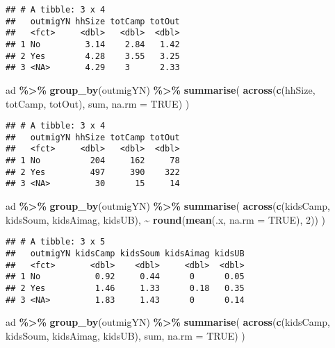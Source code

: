 \documentclass[
]{article}
\newenvironment{Shaded}{\begin{snugshade}}{\end{snugshade}}
\newcommand{\AttributeTok}[1]{\textcolor[rgb]{0.13,0.29,0.53}{#1}}
\newcommand{\ConstantTok}[1]{\textcolor[rgb]{0.56,0.35,0.01}{#1}}
\newcommand{\DecValTok}[1]{\textcolor[rgb]{0.00,0.00,0.81}{#1}}
\newcommand{\FunctionTok}[1]{\textcolor[rgb]{0.13,0.29,0.53}{\textbf{#1}}}
\newcommand{\NormalTok}[1]{#1}
\newcommand{\SpecialCharTok}[1]{\textcolor[rgb]{0.81,0.36,0.00}{\textbf{#1}}}
\begin{document}
\begin{verbatim}
## # A tibble: 3 x 4
##   outmigYN hhSize totCamp totOut
##   <fct>     <dbl>   <dbl>  <dbl>
## 1 No         3.14    2.84   1.42
## 2 Yes        4.28    3.55   3.25
## 3 <NA>       4.29    3      2.33
\end{verbatim}

\begin{Shaded}
\begin{Highlighting}[]
\NormalTok{ad }\SpecialCharTok{\%\textgreater{}\%} 
  \FunctionTok{group\_by}\NormalTok{(outmigYN) }\SpecialCharTok{\%\textgreater{}\%}
  \FunctionTok{summarise}\NormalTok{(}
    \FunctionTok{across}\NormalTok{(}\FunctionTok{c}\NormalTok{(hhSize, totCamp, totOut), sum, }\AttributeTok{na.rm =} \ConstantTok{TRUE}\NormalTok{)}
\NormalTok{  ) }
\end{Highlighting}
\end{Shaded}

\begin{verbatim}
## # A tibble: 3 x 4
##   outmigYN hhSize totCamp totOut
##   <fct>     <dbl>   <dbl>  <dbl>
## 1 No          204     162     78
## 2 Yes         497     390    322
## 3 <NA>         30      15     14
\end{verbatim}

\begin{Shaded}
\begin{Highlighting}[]
\NormalTok{ad }\SpecialCharTok{\%\textgreater{}\%} 
  \FunctionTok{group\_by}\NormalTok{(outmigYN) }\SpecialCharTok{\%\textgreater{}\%}
  \FunctionTok{summarise}\NormalTok{(}
    \FunctionTok{across}\NormalTok{(}\FunctionTok{c}\NormalTok{(kidsCamp, kidsSoum, kidsAimag, kidsUB), }\SpecialCharTok{\textasciitilde{}} \FunctionTok{round}\NormalTok{(}\FunctionTok{mean}\NormalTok{(.x, }\AttributeTok{na.rm =} \ConstantTok{TRUE}\NormalTok{), }\DecValTok{2}\NormalTok{))}
\NormalTok{  ) }
\end{Highlighting}
\end{Shaded}

\begin{verbatim}
## # A tibble: 3 x 5
##   outmigYN kidsCamp kidsSoum kidsAimag kidsUB
##   <fct>       <dbl>    <dbl>     <dbl>  <dbl>
## 1 No           0.92     0.44      0      0.05
## 2 Yes          1.46     1.33      0.18   0.35
## 3 <NA>         1.83     1.43      0      0.14
\end{verbatim}

\begin{Shaded}
\begin{Highlighting}[]
\NormalTok{ad }\SpecialCharTok{\%\textgreater{}\%} 
  \FunctionTok{group\_by}\NormalTok{(outmigYN) }\SpecialCharTok{\%\textgreater{}\%}
  \FunctionTok{summarise}\NormalTok{(}
    \FunctionTok{across}\NormalTok{(}\FunctionTok{c}\NormalTok{(kidsCamp, kidsSoum, kidsAimag, kidsUB), sum, }\AttributeTok{na.rm =} \ConstantTok{TRUE}\NormalTok{)}
\NormalTok{  ) }
\end{Highlighting}
\end{Shaded}
\end{document}
